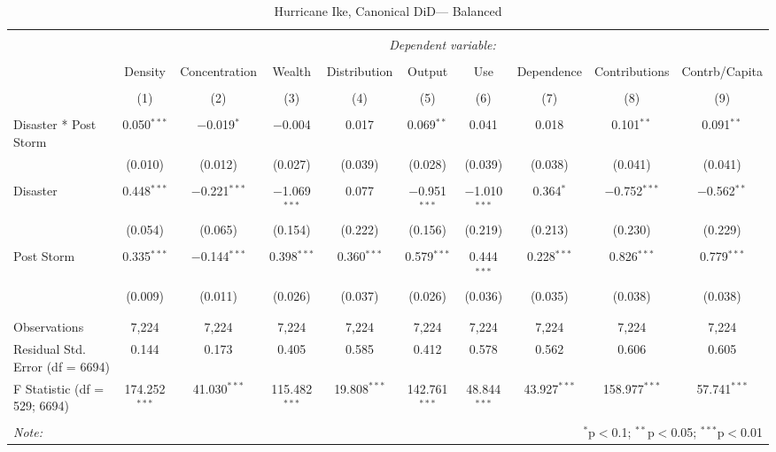 
\begin{table}[!htbp] \centering 
  \caption{Hurricane Ike, Canonical DiD--- Balanced} 
  \label{} 
\footnotesize 
\begin{tabular}{@{\extracolsep{5pt}}lccccccccc} 
\\[-1.8ex]\hline 
\hline \\[-1.8ex] 
 & \multicolumn{9}{c}{\textit{Dependent variable:}} \\ 
\cline{2-10} 
\\[-1.8ex] & Density & Concentration & Wealth & Distribution & Output & Use & Dependence & Contributions & Contrb/Capita \\ 
\\[-1.8ex] & (1) & (2) & (3) & (4) & (5) & (6) & (7) & (8) & (9)\\ 
\hline \\[-1.8ex] 
 Disaster * Post Storm & 0.050$^{***}$ & $-$0.019$^{*}$ & $-$0.004 & 0.017 & 0.069$^{**}$ & 0.041 & 0.018 & 0.101$^{**}$ & 0.091$^{**}$ \\ 
  & (0.010) & (0.012) & (0.027) & (0.039) & (0.028) & (0.039) & (0.038) & (0.041) & (0.041) \\ 
  & & & & & & & & & \\ 
 Disaster & 0.448$^{***}$ & $-$0.221$^{***}$ & $-$1.069$^{***}$ & 0.077 & $-$0.951$^{***}$ & $-$1.010$^{***}$ & 0.364$^{*}$ & $-$0.752$^{***}$ & $-$0.562$^{**}$ \\ 
  & (0.054) & (0.065) & (0.154) & (0.222) & (0.156) & (0.219) & (0.213) & (0.230) & (0.229) \\ 
  & & & & & & & & & \\ 
 Post Storm & 0.335$^{***}$ & $-$0.144$^{***}$ & 0.398$^{***}$ & 0.360$^{***}$ & 0.579$^{***}$ & 0.444$^{***}$ & 0.228$^{***}$ & 0.826$^{***}$ & 0.779$^{***}$ \\ 
  & (0.009) & (0.011) & (0.026) & (0.037) & (0.026) & (0.036) & (0.035) & (0.038) & (0.038) \\ 
  & & & & & & & & & \\ 
\hline \\[-1.8ex] 
Observations & 7,224 & 7,224 & 7,224 & 7,224 & 7,224 & 7,224 & 7,224 & 7,224 & 7,224 \\ 
Residual Std. Error (df = 6694) & 0.144 & 0.173 & 0.405 & 0.585 & 0.412 & 0.578 & 0.562 & 0.606 & 0.605 \\ 
F Statistic (df = 529; 6694) & 174.252$^{***}$ & 41.030$^{***}$ & 115.482$^{***}$ & 19.808$^{***}$ & 142.761$^{***}$ & 48.844$^{***}$ & 43.927$^{***}$ & 158.977$^{***}$ & 57.741$^{***}$ \\ 
\hline 
\hline \\[-1.8ex] 
\textit{Note:}  & \multicolumn{9}{r}{$^{*}$p$<$0.1; $^{**}$p$<$0.05; $^{***}$p$<$0.01} \\ 
\end{tabular} 
\end{table} 
